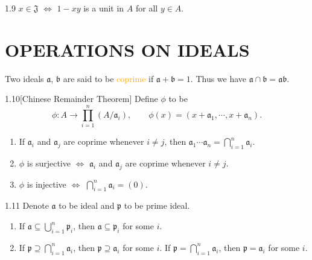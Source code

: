 \begin{proposition}{1.9}
	$x\in\mathfrak{J}$ $\Leftrightarrow$ $1-xy$ is a unit in $A$ for all $y\in A$.
\end{proposition}

\section*{OPERATIONS ON IDEALS}

Two ideals $\mathfrak{a}$, $\mathfrak{b}$ are said to be \textcolor{orange}{coprime} if $\mathfrak{a}+\mathfrak{b}=1$. Thus we have $\mathfrak{a}\cap\mathfrak{b}=\mathfrak{ab}$.

\begin{proposition}{1.10}[Chinese Remainder Theorem]
	Define $\phi$ to be
	\begin{equation*}
		\phi: A\rightarrow\prod_{i=1}^n\left(A/\mathfrak{a}_i\right),\qquad\phi(x)=\left(x+\mathfrak{a}_1,\cdots,x+\mathfrak{a}_n\right).
	\end{equation*}
	\begin{enumerate}[label=\textup{(\roman*)}]
		\item If $\mathfrak{a}_i$ and $\mathfrak{a}_j$ are coprime whenever $i\neq j$, then $\mathfrak{a}_1\cdots\mathfrak{a}_n=\bigcap_{i=1}^n\mathfrak{a}_i$.
		\item $\phi$ is surjective $\Leftrightarrow$ $\mathfrak{a}_i$ and $\mathfrak{a}_j$ are coprime whenever $i\neq j$.
		\item $\phi$ is injective $\Leftrightarrow$ $\bigcap_{i=1}^n\mathfrak{a}_i=(0)$.
	\end{enumerate}
\end{proposition}

\begin{proposition}{1.11}
	Denote $\mathfrak{a}$ to be ideal and $\mathfrak{p}$ to be prime ideal.
	\begin{enumerate}[label=\textup{(\roman*)},ref=\thepropositiontemp(\roman*)]
		\item\label{1.11.1} If $\mathfrak{a}\subseteq\bigcup_{i=1}^n\mathfrak{p}_i$, then $\mathfrak{a}\subseteq\mathfrak{p}_i$ for some $i$.
		\item\label{1.11.2} If $\mathfrak{p}\supseteq\bigcap_{i=1}^n\mathfrak{a}_i$, then $\mathfrak{p}\supseteq\mathfrak{a}_i$ for some $i$. If $\mathfrak{p}=\bigcap_{i=1}^n\mathfrak{a}_i$, then $\mathfrak{p}=\mathfrak{a}_i$ for some $i$.
	\end{enumerate}
\end{proposition}


